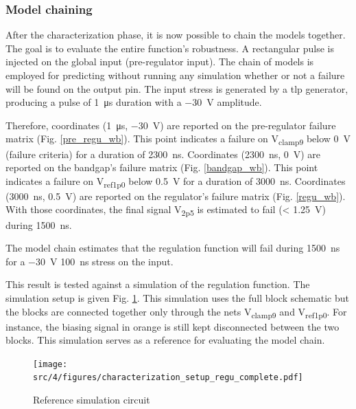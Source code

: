 \subsubsection{Model chaining}

After the characterization phase, it is now possible to chain the models together.
The goal is to evaluate the entire function's robustness.
A rectangular pulse is injected on the global input (pre-regulator input).
The chain of models is employed for predicting without running any simulation whether or not a failure will be found on the output pin.
The input stress is generated by a \gls{tlp} generator, producing a pulse of \SI{1}{\micro\second} duration with a \SI{-30}{\volt} amplitude.

Therefore, coordinates (\SI{1}{\micro\second}, \SI{-30}{\volt}) are reported on the pre-regulator failure matrix (Fig. \ref{pre_regu_wb}).
This point indicates a failure on V\textsubscript{clamp9} below \SI{0}{\volt} (failure criteria) for a duration of \SI{2300}{\nano\second}.
Coordinates (\SI{2300}{\nano\second}, \SI{0}{\volt}) are reported on the bandgap's failure matrix (Fig. \ref{bandgap_wb}).
This point indicates a failure on V\textsubscript{ref1p0} below \SI{0.5}{\volt} for a duration of \SI{3000}{\nano\second}.
Coordinates (\SI{3000}{\nano\second}, \SI{0.5}{\volt}) are reported on the regulator's failure matrix (Fig. \ref{regu_wb}).
With those coordinates, the final signal V\textsubscript{2p5} is estimated to fail (< \SI{1.25}{\volt}) during \SI{1500}{\nano\second}.

The model chain estimates that the regulation function will fail during \SI{1500}{\nano\second} for a \SI{-30}{\volt} \SI{100}{\nano\second} stress on the input.

This result is tested against a simulation of the regulation function.
The simulation setup is given Fig. \ref{fig:reference_simu_circuit}.
This simulation uses the full block schematic but the blocks are connected together only through the nets V\textsubscript{clamp9} and V\textsubscript{ref1p0}.
For instance, the biasing signal in orange is still kept disconnected between the two blocks.
This simulation serves as a reference for evaluating the model chain.

\begin{figure}[!h]
  \centering
  \texttt{[image: src/4/figures/characterization\_setup\_regu\_complete.pdf]}
  \caption{Reference simulation circuit}
  \label{fig:reference_simu_circuit}
\end{figure}

